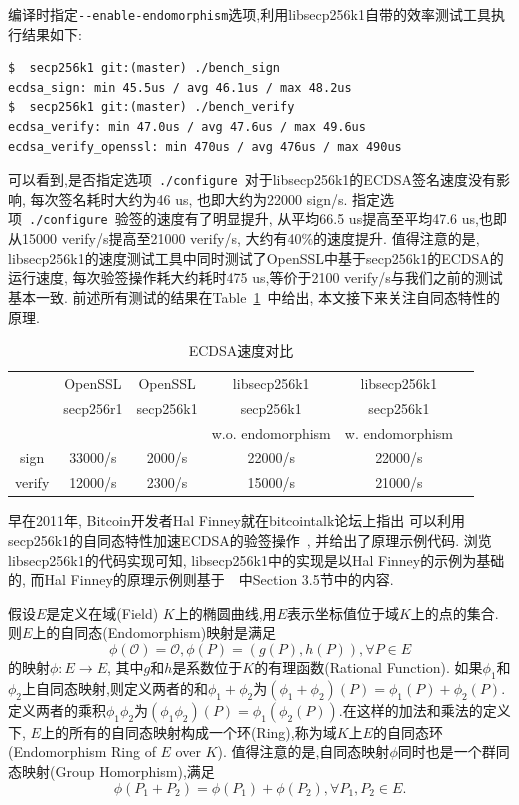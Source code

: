 \documentclass{article}
\newcommand{\code}[1]{\lstinline!#1!}
\begin{document}
编译时指定\code{--enable-endomorphism}选项,利用libsecp256k1自带的效率测试工具执行结果如下:

\begin{lstlisting}[caption=\texttt{libsecp256k1 benchmark with --enable-endomorphism}]
$  secp256k1 git:(master) ./bench_sign  
ecdsa_sign: min 45.5us / avg 46.1us / max 48.2us
$  secp256k1 git:(master) ./bench_verify 
ecdsa_verify: min 47.0us / avg 47.6us / max 49.6us
ecdsa_verify_openssl: min 470us / avg 476us / max 490us
\end{lstlisting}

可以看到,是否指定选项~\code{./configure}~对于libsecp256k1的ECDSA签名速度没有影响,
每次签名耗时大约为46 us, 也即大约为22000 sign/s. 指定选项~\code{./configure}~验签的速度有了明显提升,
从平均66.5 us提高至平均47.6 us,也即从15000 verify/s提高至21000 verify/s, 大约有40\%的速度提升.
值得注意的是, libsecp256k1的速度测试工具中同时测试了OpenSSL中基于secp256k1的ECDSA的运行速度,
每次验签操作耗大约耗时475 us,等价于2100 verify/s与我们之前的测试基本一致.
前述所有测试的结果在Table~\ref{tbl-ecdsa-bench}~中给出, 本文接下来关注自同态特性的原理.

\begin{table}[h]
\centering
\caption{ECDSA速度对比}\label{tbl-ecdsa-bench}
\begin{tabular}{|c|c|c|c|c|c|}
\hline
\small
         & OpenSSL & OpenSSL & libsecp256k1 & libsecp256k1 \\
         & secp256r1 & secp256k1 & secp256k1  & secp256k1 \\
         &                 &                 & w.o. endomorphism & w. endomorphism \\\hline
 sign  & 33000/s  & 2000/s & 22000/s & 22000/s \\\hline
 verify & 12000/s & 2300/s & 15000/s & 21000/s \\\hline
\end{tabular}
\end{table}

早在2011年, Bitcoin开发者Hal Finney就在bitcointalk论坛上指出
可以利用secp256k1的自同态特性加速ECDSA的验签操作~\cite{halfinney}, 并给出了原理示例代码.
浏览libsecp256k1的代码实现可知, libsecp256k1中的实现是以Hal Finney的示例为基础的,
而Hal Finney的原理示例则基于~\cite{guidetoecc}~中Section 3.5节中的内容.

假设$E$是定义在域(Field) $K$上的椭圆曲线,用$E$表示坐标值位于域$K$上的点的集合.
则$E$上的自同态(Endomorphism)映射是满足
$$\phi(\mathcal{O}) = \mathcal{O}, \phi(P) = (g(P), h(P)), \forall P \in E$$
的映射$\phi: E \rightarrow E$, 其中$g$和$h$是系数位于$K$的有理函数(Rational Function).
如果$\phi_1$和$\phi_2$上自同态映射,则定义两者的和$\phi_1+\phi_2$为$(\phi_1+\phi_2)(P) = \phi_1(P) + \phi_2(P)$.
定义两者的乘积$\phi_1\phi_2$为$(\phi_1\phi_2)(P)=\phi_1(\phi_2(P))$.在这样的加法和乘法的定义下,
$E$上的所有的自同态映射构成一个环(Ring),称为域$K$上$E$的自同态环(Endomorphism Ring of $E$ over $K$).
值得注意的是,自同态映射$\phi$同时也是一个群同态映射(Group Homorphism),满足
$$\phi(P_1 + P_2) = \phi(P_1) + \phi(P_2), \forall P_1, P_2 \in E.$$
\end{document}
